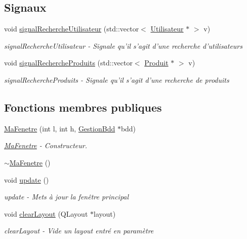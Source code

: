 \subsection*{Signaux}
\begin{DoxyCompactItemize}
\item 
void \hyperlink{class_ma_fenetre_aed4dd546bfb6e374aa317946e9247d4f}{signal\-Recherche\-Utilisateur} (std\-::vector$<$ \hyperlink{class_utilisateur}{Utilisateur} $\ast$ $>$ v)
\begin{DoxyCompactList}\small\item\em signal\-Recherche\-Utilisateur -\/ Signale qu'il s'agit d'une recherche d'utilisateurs \end{DoxyCompactList}\item 
void \hyperlink{class_ma_fenetre_a75cd895beb38fe68a4319eb6c37ac8ee}{signal\-Recherche\-Produits} (std\-::vector$<$ \hyperlink{class_produit}{Produit} $\ast$ $>$ v)
\begin{DoxyCompactList}\small\item\em signal\-Recherche\-Produits -\/ Signale qu'il s'agit d'une recherche de produits \end{DoxyCompactList}\end{DoxyCompactItemize}
\subsection*{Fonctions membres publiques}
\begin{DoxyCompactItemize}
\item 
\hyperlink{class_ma_fenetre_ae39212ca7a4d4b4c99a13b1d5eb063fa}{Ma\-Fenetre} (int l, int h, \hyperlink{class_gestion_bdd}{Gestion\-Bdd} $\ast$bdd)
\begin{DoxyCompactList}\small\item\em \hyperlink{class_ma_fenetre}{Ma\-Fenetre} -\/ Constructeur. \end{DoxyCompactList}\item 
\hyperlink{class_ma_fenetre_a2396ba2918e49df8d0c4a8c70f927151}{$\sim$\-Ma\-Fenetre} ()
\item 
void \hyperlink{class_ma_fenetre_a342da912af9b611d47229fd190d68522}{update} ()
\begin{DoxyCompactList}\small\item\em update -\/ Mets à jour la fenêtre principal \end{DoxyCompactList}\item 
void \hyperlink{class_ma_fenetre_a4bc520a56473760bb8433a1de67da378}{clear\-Layout} (Q\-Layout $\ast$layout)
\begin{DoxyCompactList}\small\item\em clear\-Layout -\/ Vide un layout entré en paramètre \end{DoxyCompactList}\end{DoxyCompactItemize}
